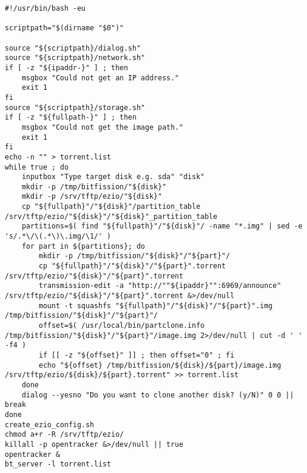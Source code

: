 \begin{minipage}{\textwidth}
\begin{lstlisting}[caption={The Shell Script of BitFission Server}]
#!/usr/bin/bash -eu

scriptpath="$(dirname "$0")"

source "${scriptpath}/dialog.sh"
source "${scriptpath}/network.sh"
if [ -z "${ipaddr-}" ] ; then
	msgbox "Could not get an IP address."
	exit 1
fi
source "${scriptpath}/storage.sh"
if [ -z "${fullpath-}" ] ; then
	msgbox "Could not get the image path."
	exit 1
fi
echo -n "" > torrent.list
while true ; do
	inputbox "Type target disk e.g. sda" "disk"
	mkdir -p /tmp/bitfission/"${disk}"
	mkdir -p /srv/tftp/ezio/"${disk}"
	cp "${fullpath}"/"${disk}"/partition_table /srv/tftp/ezio/"${disk}"/"${disk}"_partition_table
	partitions=$( find "${fullpath}"/"${disk}"/ -name "*.img" | sed -e 's/.*\/\(.*\)\.img/\1/' )
	for part in ${partitions}; do
		mkdir -p /tmp/bitfission/"${disk}"/"${part}"/
		cp "${fullpath}"/"${disk}"/"${part}".torrent /srv/tftp/ezio/"${disk}"/"${part}".torrent
		transmission-edit -a "http://""${ipaddr}"":6969/announce" /srv/tftp/ezio/"${disk}"/"${part}".torrent &>/dev/null
		mount -t squashfs "${fullpath}"/"${disk}"/"${part}".img /tmp/bitfission/"${disk}"/"${part}"/
		offset=$( /usr/local/bin/partclone.info /tmp/bitfission/"${disk}"/"${part}"/image.img 2>/dev/null | cut -d ' ' -f4 )
		if [[ -z "${offset}" ]] ; then offset="0" ; fi
		echo "${offset} /tmp/bitfission/${disk}/${part}/image.img /srv/tftp/ezio/${disk}/${part}.torrent" >> torrent.list
	done
	dialog --yesno "Do you want to clone another disk? (y/N)" 0 0 || break
done
create_ezio_config.sh
chmod a+r -R /srv/tftp/ezio/
killall -p opentracker &>/dev/null || true
opentracker &
bt_server -l torrent.list
\end{lstlisting}
\end{minipage}
